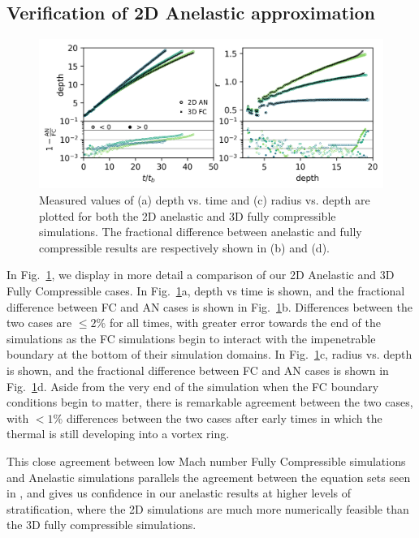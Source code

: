 \documentclass[twocolumn, amsmath, amsfonts, amssymb, trackchanges]{aastex62}
\begin{document}
\subsection{Verification of 2D Anelastic approximation}
\begin{figure}[t!]
    \includegraphics[width=\textwidth]{diff_AN_FC.png}
    \caption{Measured values of (a) depth vs. time and (c) radius vs. depth are plotted
	for both the 2D anelastic and 3D fully compressible simulations. The fractional
	difference between anelastic and fully compressible results are respectively shown
	in (b) and (d).
    \label{fig:diff} }
\end{figure}

In Fig.~\ref{fig:diff}, we display in more detail a comparison of our 2D Anelastic and
3D Fully Compressible cases. In Fig.~\ref{fig:diff}a, depth vs time is shown, and the
fractional difference between FC and AN cases is shown in Fig.~\ref{fig:diff}b.
Differences between the two cases are $\leq 2$\% for all times, with greater error towards
the end of the simulations as the FC simulations begin to interact with the impenetrable
boundary at the bottom of their simulation domains.  In Fig.~\ref{fig:diff}c, radius
vs. depth is shown, and the fractional difference between FC and AN cases is shown in
Fig.~\ref{fig:diff}d. Aside from the very end of the simulation when the FC boundary conditions
begin to matter, there is remarkable agreement between the two cases, with $< 1$\% differences
between the two cases after early times in which the thermal is still developing into a vortex
ring.

This close agreement between low Mach number Fully Compressible simulations and Anelastic
simulations parallels the agreement between the equation sets seen in \citet{lecoanet&all2014},
and gives us confidence in our anelastic results at higher levels of stratification, where
the 2D simulations are much more numerically feasible than the 3D fully compressible simulations.
\end{document}
